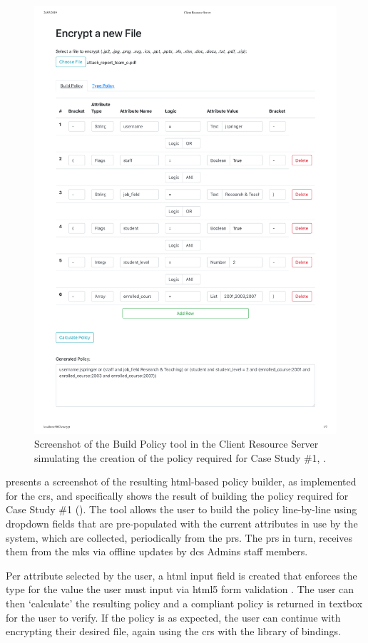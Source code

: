 \begin{figure}[htp]
    \centering
    \includegraphics[width=\linewidth,keepaspectratio]{appendices/building_policy.pdf}

    \caption{
      \label{fig:policy_builder}
      Screenshot of the Build Policy tool in the Client Resource Server simulating the creation of the policy required for Case Study \#1, .
    }

\end{figure}

 presents a screenshot of the resulting \acrshort{html}-based policy builder, as implemented for the \acrfull{crs}, and specifically shows the result of building the policy required for Case Study \#1 (). The tool allows the user to build the policy line-by-line using dropdown fields that are pre-populated with the current attributes in use by the \theResServer system, which are collected, periodically from the \acrshort{prs}. The \acrshort{prs} in turn, receives them from the \acrshort{mks} via offline updates by \acrshort{dcs} Admins staff members.

Per attribute selected by the user, a \acrshort{html} input field is created that enforces the type for the value the user must input via \acrshort{html}5 form validation \citep{Foundation2019}. The user can then `calculate' the resulting policy and a \PyOpenABE compliant policy is returned in textbox for the user to verify. If the policy is as expected, the user can continue with encrypting their desired file, again using the \acrshort{crs} with the \PyOpenABE library of bindings.
